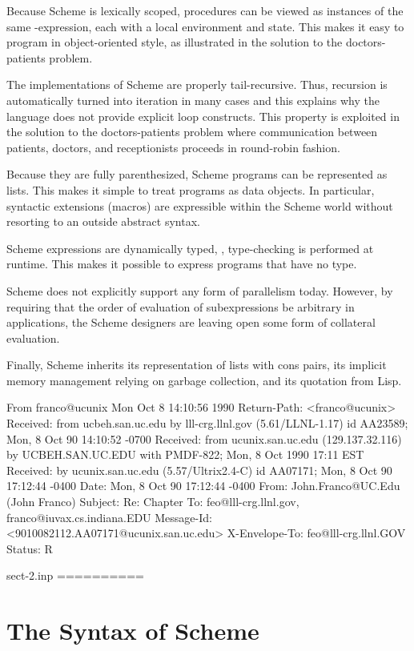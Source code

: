Because Scheme is lexically scoped, procedures can be viewed as
instances of the same \lam-expression, each with a local environment
and state.  This makes it easy to program in object-oriented style,
as illustrated in the solution to the doctors-patients problem.

The implementations of Scheme are properly tail-recursive.  Thus,
recursion is automatically turned into iteration in many cases
and this explains why the language does not provide explicit
loop constructs.  This property is exploited in the solution to the
doctors-patients problem where communication between patients,
doctors, and receptionists proceeds in round-robin fashion.

Because they are fully parenthesized, Scheme programs can be
represented as lists.  This makes it simple to treat programs as data
objects.  In particular, syntactic extensions (macros) are expressible
within the Scheme world without resorting to an outside abstract
syntax.

Scheme expressions are dynamically typed, \ie, type-checking is
performed at runtime.  This makes it possible to express programs that
have no type.

Scheme does not explicitly support any form of parallelism today.
However, by requiring that the order of evaluation of subexpressions
be arbitrary in applications, the Scheme designers are leaving open
some form of collateral evaluation.

Finally, Scheme inherits its representation of lists with cons pairs,
its implicit memory management relying on garbage collection, and its
quotation from Lisp.


From franco@ucunix Mon Oct  8 14:10:56 1990
Return-Path: <franco@ucunix>
Received: from ucbeh.san.uc.edu by lll-crg.llnl.gov (5.61/LLNL-1.17)
	id AA23589; Mon, 8 Oct 90 14:10:52 -0700
Received: from ucunix.san.uc.edu (129.137.32.116) by UCBEH.SAN.UC.EDU with
 PMDF-822; Mon, 8 Oct 1990 17:11 EST
Received: by ucunix.san.uc.edu (5.57/Ultrix2.4-C) id AA07171; Mon, 8 Oct 90
 17:12:44 -0400
Date: Mon, 8 Oct 90 17:12:44 -0400
From: John.Franco@UC.Edu (John Franco)
Subject: Re:  Chapter
To: feo@lll-crg.llnl.gov, franco@iuvax.cs.indiana.EDU
Message-Id: <9010082112.AA07171@ucunix.san.uc.edu>
X-Envelope-To: feo@lll-crg.llnl.GOV
Status: R

sect-2.inp
==========

\section{The Syntax of Scheme}

